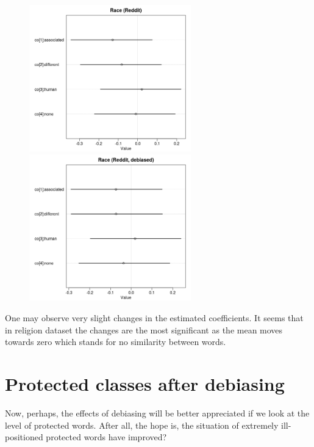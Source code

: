 \documentclass[12pt,]{book}
\begin{document}
\begin{center}
\begin{figure}[!htb]
   
  \begin{minipage}{0.55\textwidth}
\includegraphics[width=7cm]{../images/raceCoeffs.jpeg}
\end{minipage}
   \begin {minipage}{0.43\textwidth}
    \includegraphics[width=7cm]{../images/debiasedRaceRedditCoeffs.jpeg}
   \end{minipage}
\end{figure}

\end{center}

One may observe very slight changes in the estimated coeﬀicients. It
seems that in religion dataset the changes are the most significant as
the mean moves towards zero which stands for no similarity between
words.

\section{Protected classes after
debiasing}\label{protected-classes-after-debiasing}

Now, perhaps, the effects of debiasing will be better appreciated if we
look at the level of protected words. After all, the hope is, the
situation of extremely ill-positioned protected words have improved?
\end{document}
